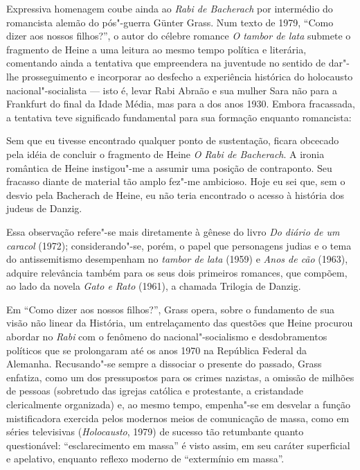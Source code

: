 Expressiva homenagem coube ainda ao \textit{Rabi de Bacherach} por
intermédio do romancista alemão do pós"-guerra Günter Grass. Num texto
de 1979, “Como dizer aos nossos filhos?”, o autor do célebre romance
\textit{O tambor de lata} submete o fragmento de Heine a uma leitura ao
mesmo tempo política e literária, comentando ainda a tentativa que
empreendera na juventude no sentido de dar"-lhe prosseguimento e
incorporar ao desfecho a experiência histórica do holocausto
nacional"-socialista --- isto é, levar Rabi Abraão e sua mulher Sara não
para a Frankfurt do final da Idade Média, mas para a dos anos 1930.
Embora fracassada, a tentativa teve significado
fundamental para sua formação enquanto romancista: 

\begin{hedraquote}
Sem que eu tivesse encontrado qualquer ponto de sustentação, ficara 
obcecado pela idéia de concluir o fragmento de Heine \textit{O Rabi de Bacherach}. A ironia
romântica de Heine instigou"-me a assumir uma posição de contraponto.
Seu fracasso diante de material tão amplo fez"-me ambicioso. Hoje eu
sei que, sem o desvio pela Bacherach de Heine, eu não teria encontrado
o acesso à história dos judeus de Danzig. 
\end{hedraquote}

Essa observação refere"-se
mais diretamente à gênese do livro \textit{Do diário de um caracol}
(1972); considerando"-se, porém, o papel que personagens judias e o
tema do antissemitismo desempenham no \textit{tambor de lata} (1959)
e \textit{Anos de cão} (1963), adquire relevância também para os seus
dois primeiros romances, que compõem, ao lado da novela \textit{Gato e
Rato }(1961), a chamada Trilogia de Danzig.

Em “Como dizer aos nossos filhos?”, Grass opera, sobre o fundamento de
sua visão não linear da História, um entrelaçamento das questões que
Heine procurou abordar no \textit{Rabi }com o fenômeno do
nacional"-socialismo e desdobramentos políticos que se prolongaram até
os anos 1970 na República Federal da Alemanha. Recusando"-se sempre a
dissociar o presente do passado, Grass enfatiza, como um dos
pressupostos para os crimes nazistas, a omissão de milhões de pessoas
(sobretudo das igrejas católica e protestante, a cristandade
clericalmente organizada) e, ao mesmo tempo, empenha"-se em desvelar a
função mistificadora exercida pelos modernos meios de comunicação de
massa, como em séries televisivas (\textit{Holocausto}, 1979) de
sucesso tão retumbante quanto questionável: “esclarecimento em massa” é
visto assim, em seu caráter superficial e apelativo, enquanto reflexo
moderno de “extermínio em massa”.

